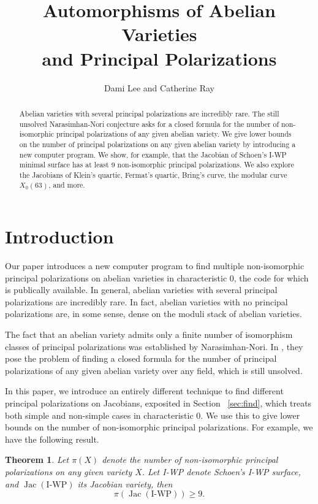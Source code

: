 \documentclass[12pt,reqno]{amsart}
\title[Automorphisms of Abelian Varieties and Principal Polarizations]{Automorphisms of Abelian Varieties \\ and Principal Polarizations}
\author{Dami Lee and Catherine Ray}
\DeclareMathOperator{\Jac}{Jac}
\newtheorem{theorem}{Theorem}
\theoremstyle{definition}
\theoremstyle{remark}
\begin{document}
  
\maketitle

\begin{abstract} Abelian varieties with several principal polarizations are incredibly rare. The still unsolved Narasimhan-Nori conjecture asks for a closed formula for the number of non-isomorphic principal polarizations of any given abelian variety. We give lower bounds on the number of principal polarizations on any given abelian variety by introducing a new computer program.
We show, for example, that the Jacobian of Schoen's I-WP minimal surface has at least 9 non-isomorphic principal polarizations. We also explore the Jacobians of Klein's quartic, Fermat's quartic, Bring's curve, the modular curve $X_0(63)$, and more.   
\end{abstract}

\section{Introduction}

Our paper introduces a new computer program to find multiple non-isomorphic principal polarizations on abelian varieties in characteristic 0, the code for which is publically available. In general, abelian varieties with several principal polarizations are incredibly rare. In fact, abelian varieties with no principal polarizations are, in some sense, dense on the moduli stack of abelian varieties. %

The fact that an abelian variety admits only a finite number of isomorphism classes of principal polarizations was established by Narasimhan-Nori. In \cite{nn}, they pose the problem of finding a closed formula for the number of principal polarizations of any given abelian variety over any field, which is still unsolved. 

In this paper, we introduce an entirely different technique to find different principal polarizations on Jacobians, exposited in Section ~\ref{sec:find}, which treats both simple and non-simple cases in characteristic 0. We use this to give lower bounds on the number of non-isomorphic principal polarizations. For example, we have the following result. 

\begin{theorem} \label{IWP} Let $\pi(X)$ denote the number of non-isomorphic principal polarizations on any given variety $X$. Let I-WP denote Schoen's I-WP surface, and $\Jac(\text{I-WP})$ its Jacobian variety, then $$\pi(\Jac(\text{I-WP})) \geq 9.$$\end{theorem}
\end{document}
